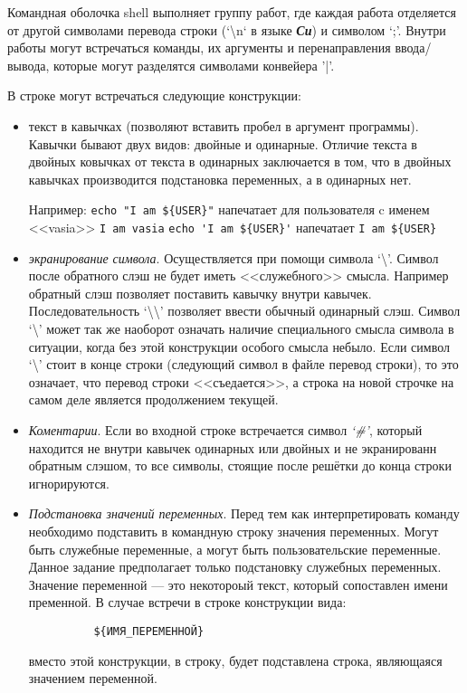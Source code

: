 \documentclass[11pt, a4paper]{article}
\begin{document}
Командная оболочка shell выполняет группу работ, где каждая работа отделяется от другой 
символами перевода строки (`{\textbackslash}n` в языке \textbf{\textit{Си}}) и символом `;'.
Внутри работы могут встречаться команды, их аргументы и перенаправления ввода/вывода, 
которые могут разделятся символами конвейера '|'. 

В строке могут встречаться следующие конструкции:
\begin{itemize}
\item текст в кавычках (позволяют вставить пробел в аргумент программы). Кавычки бывают двух видов: 
      двойные и одинарные. Отличие текста в двойных ковычках от текста в одинарных заключается в 
      том, что в двойных кавычках производится подстановка переменных, а в одинарных нет.

       Например:\newline
       \verb#echo "I am ${USER}"# напечатает для пользователя c именем <<vasia>> \newline
         \verb#I am vasia# \newline
       \verb#echo 'I am ${USER}'# напечатает \newline \verb#I am ${USER}#

    \item  \textit{экранирование символа}. Осуществляется при помощи символа `\textbackslash'. 
       Символ после обратного слэш не будет иметь <<служебного>> смысла. Например обратный слэш 
       позволяет поставить кавычку внутри кавычек. Последовательность `\textbackslash\textbackslash'
       позволяет ввести обычный одинарный слэш. Символ `\textbackslash' может так же наоборот 
       означать наличие специального смысла символа в ситуации, когда без этой конструкции особого
       смысла небыло. Если символ `\textbackslash' стоит в конце строки (следующий символ в файле 
       перевод строки), то это означает, что перевод строки <<съедается>>, а строка на новой 
       строчке на самом деле является продолжением текущей.

   \item  \textit{Коментарии}. Если во входной строке встречается символ \textit{`\#'}, который 
       находится не внутри кавычек одинарных или двойных и не экранированн обратным слэшом,
       то все символы, стоящие после решётки до конца строки игнорируются.

   \item  \textit{Подстановка значений переменных}. Перед тем как интерпретировать команду необходимо 
       подставить в командную строку значения переменных. Могут быть служебные переменные, а могут быть 
       пользовательские переменные. Данное задание предполагает только подстановку служебных переменных.
       Значение переменной --- это некотороый текст, который сопоставлен имени пременной.  
       В случае встречи в строке конструкции вида:
       {\small 
       \begin{verbatim}
          ${ИМЯ_ПЕРЕМЕННОЙ}
       \end{verbatim}
       }
       вместо этой конструкции, в строку, будет подставлена строка, являющаяся значением переменной.
\end{itemize}
\end{document}
